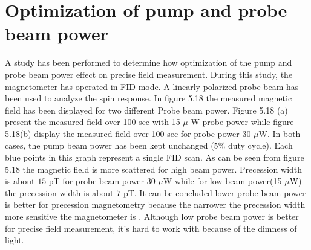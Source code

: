 \documentclass[12pt]{report}
\begin{document}
   \section{Optimization of pump and probe beam power} 
 A study has been performed to determine how optimization of the pump and probe beam power effect on precise field measurement.  During this study, the magnetometer has operated in FID mode.  A  linearly polarized probe beam has been used to analyze the spin response. In figure 5.18 the measured magnetic field has been displayed for two different  Probe beam power. Figure 5.18 (a) present the measured field over 100 sec with 15 $\mu$ W probe power while figure 5.18(b) display the measured field over 100 sec for probe power 30 $\mu$W. In both cases, the pump beam power has been kept unchanged ($5\%$ duty cycle). Each blue points in this graph represent a single FID scan. As can be seen from figure 5.18 the magnetic field is more scattered for high beam power. Precession width is about $15$ pT for probe beam power 30 $\mu$W while for low beam power(15 $\mu$W) the precession width is about $7$ pT. It can be concluded lower probe beam power is better for precession  magnetometry because the narrower the precession width more sensitive the magnetometer is . Although low probe beam power is better for precise field measurement, it's hard to work with because of the dimness of light.\\
\end{document}
